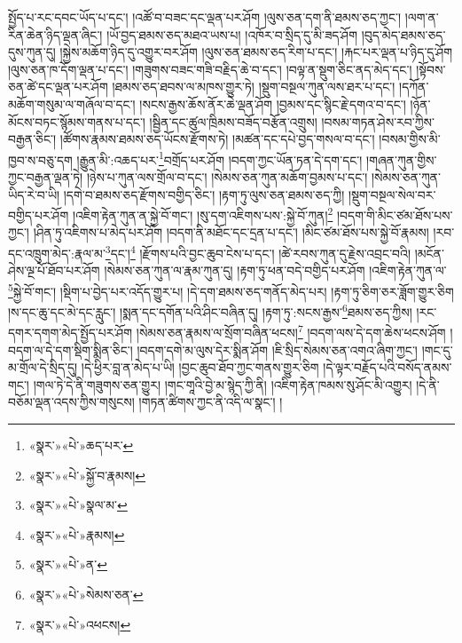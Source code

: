 སྤྱོད་པ་རང་དབང་ཡོད་པ་དང་། །འཚོ་བ་བཟང་དང་ལྡན་པར་ཤོག །ལུས་ཅན་དག་ནི་ཐམས་ཅད་ཀྱང་། །ལག་ན་རིན་ཆེན་ཉིད་ལྡན་ཞིང་། །ཡོ་བྱད་ཐམས་ཅད་མཐའ་ཡས་པ། །འཁོར་བ་སྲིད་དུ་མི་ཟད་ཤོག །བུད་མེད་ཐམས་ཅད་དུས་ཀུན་དུ། །སྐྱེས་མཆོག་ཉིད་དུ་འགྱུར་བར་ཤོག །ལུས་ཅན་ཐམས་ཅད་རིག་པ་དང་། །རྐང་པར་ལྡན་པ་ཉིད་དུ་ཤོག །ལུས་ཅན་ཁ་དོག་ལྡན་པ་དང་། །གཟུགས་བཟང་གཟི་བརྗིད་ཆེ་བ་དང་། །བལྟ་ན་སྡུག་ཅིང་ནད་མེད་དང་། །སྟོབས་ཅན་ཚེ་དང་ལྡན་པར་ཤོག །ཐམས་ཅད་ཐབས་ལ་མཁས་གྱུར་ཏེ། །སྡུག་བསྔལ་ཀུན་ལས་ཐར་པ་དང་། །དཀོན་མཆོག་གསུམ་ལ་གཞོལ་བ་དང་། །སངས་རྒྱས་ཆོས་ནོར་ཆེ་ལྡན་ཤོག །བྱམས་དང་སྙིང་རྗེ་དགའ་བ་དང་། །ཉོན་མོངས་བཏང་སྙོམས་གནས་པ་དང་། །སྦྱིན་དང་ཚུལ་ཁྲིམས་བཟོད་བརྩོན་འགྲུས། །བསམ་གཏན་ཤེས་རབ་ཀྱིས་བརྒྱན་ཅིང་། །ཚོགས་རྣམས་ཐམས་ཅད་ཡོངས་རྫོགས་ཏེ། །མཚན་དང་དཔེ་བྱད་གསལ་བ་དང་། །བསམ་གྱིས་མི་ཁྱབ་ས་བཅུ་དག །རྒྱུན་མི་:འཆད་པར་\footnote{«སྣར་»«པེ་»ཆད་པར་}བགྲོད་པར་ཤོག །བདག་ཀྱང་ཡོན་ཏན་དེ་དག་དང་། །གཞན་ཀུན་གྱིས་ཀྱང་བརྒྱན་ལྡན་ཏེ། །ཉེས་པ་ཀུན་ལས་གྲོལ་བ་དང་། །སེམས་ཅན་ཀུན་མཆོག་བྱམས་པ་དང་། །སེམས་ཅན་ཀུན་ཡིད་རེ་བ་ཡི། །དགེ་བ་ཐམས་ཅད་རྫོགས་བགྱིད་ཅིང་། །རྟག་ཏུ་ལུས་ཅན་ཐམས་ཅད་ཀྱི། །སྡུག་བསྔལ་སེལ་བར་བགྱིད་པར་ཤོག །འཇིག་རྟེན་ཀུན་ན་སྐྱེ་བོ་གང་། །སུ་དག་འཇིགས་པས་:སྐྱེ་བོ་ཀུན།\footnote{«སྣར་»«པེ་»སྐྱོ་བ་རྣམས།} །བདག་གི་མིང་ཙམ་ཐོས་པས་ཀྱང་། །ཤིན་ཏུ་འཇིགས་པ་མེད་པར་ཤོག །བདག་ནི་མཐོང་དང་དྲན་པ་དང་། །མིང་ཙམ་ཐོས་པས་སྐྱེ་བོ་རྣམས། །རབ་དང་འཁྲུག་མེད་:རྣལ་མ་\footnote{«སྣར་»«པེ་»སྣལ་མ་}དང་།\footnote{«སྣར་»«པེ་»རྣམས།} །རྫོགས་པའི་བྱང་ཆུབ་ངེས་པ་དང་། །ཚེ་རབས་ཀུན་དུ་རྗེས་འབྲང་བའི། །མངོན་ཤེས་ལྔ་པོ་ཐོབ་པར་ཤོག །སེམས་ཅན་ཀུན་ལ་རྣམ་ཀུན་དུ། །རྟག་ཏུ་ཕན་བདེ་བགྱིད་པར་ཤོག །འཇིག་རྟེན་ཀུན་ལ་\footnote{«སྣར་»«པེ་»ན་}སྐྱེ་བོ་གང་། །སྡིག་པ་བྱེད་པར་འདོད་གྱུར་པ། །དེ་དག་ཐམས་ཅད་གནོད་མེད་པར། །རྟག་ཏུ་ཅིག་ཅར་ཟློག་གྱུར་ཅིག །ས་དང་ཆུ་དང་མེ་དང་རླུང་། །སྨན་དང་དགོན་པའི་ཤིང་བཞིན་དུ། །རྟག་ཏུ་:སངས་རྒྱས་\footnote{«སྣར་»«པེ་»སེམས་ཅན་}ཐམས་ཅད་ཀྱིས། །རང་དགར་དགག་མེད་སྤྱོད་པར་ཤོག །སེམས་ཅན་རྣམས་ལ་སྲོག་བཞིན་ཕངས།\footnote{«སྣར་»«པེ་»འཕངས།} །བདག་ལས་དེ་དག་ཆེས་ཕངས་ཤོག །བདག་ལ་དེ་དག་སྡིག་སྨིན་ཅིང་། །བདག་དགེ་མ་ལུས་དེར་སྨིན་ཤོག །ཇི་སྲིད་སེམས་ཅན་འགའ་ཞིག་ཀྱང་། །གང་དུ་མ་གྲོལ་དེ་སྲིད་དུ། །དེ་ཕྱིར་བླ་ན་མེད་པ་ཡི། །བྱང་ཆུབ་ཐོབ་ཀྱང་གནས་གྱུར་ཅིག །དེ་ལྟར་བརྗོད་པའི་བསོད་ནམས་གང་། །གལ་ཏེ་དེ་ནི་གཟུགས་ཅན་གྱུར། །གང་གཱའི་བྱེ་མ་སྙེད་ཀྱི་ནི། །འཇིག་རྟེན་ཁམས་སུ་ཤོང་མི་འགྱུར། །དེ་ནི་བཅོམ་ལྡན་འདས་ཀྱིས་གསུངས། །གཏན་ཚིགས་ཀྱང་ནི་འདི་ལ་སྣང་། །

